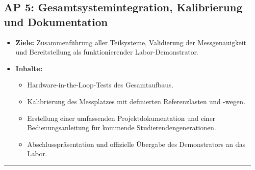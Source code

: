 \documentclass[11pt, a4paper]{article}
\begin{document}
\subsection*{AP 5: Gesamtsystemintegration, Kalibrierung und Dokumentation}
\begin{itemize}[leftmargin=*, label=$\bullet$]
    \item \textbf{Ziele:} Zusammenführung aller Teilsysteme, Validierung der Messgenauigkeit und Bereitstellung als funktionierender Labor-Demonstrator.
    \item \textbf{Inhalte:}
    \begin{itemize}[leftmargin=*]
        \item Hardware-in-the-Loop-Tests des Gesamtaufbaus.
        \item Kalibrierung des Messplatzes mit definierten Referenzlasten und -wegen.
        \item Erstellung einer umfassenden Projektdokumentation und einer Bedienungsanleitung für kommende Studierendengenerationen.
        \item Abschlusspräsentation und offizielle Übergabe des Demonstrators an das Labor.
    \end{itemize}
\end{itemize}

\vspace{1em}
\hrule
\vspace{0.5em}
\end{document}
